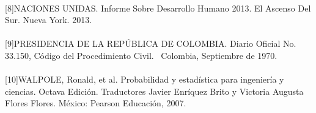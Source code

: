 \paragraph{}
[8]NACIONES UNIDAS. Informe Sobre Desarrollo Humano 2013. El Ascenso Del Sur. Nueva York. 2013.
\paragraph{}
[9]PRESIDENCIA DE LA REP\'UBLICA DE COLOMBIA. Diario Oficial No. 33.150, C\'odigo del Procedimiento Civil.  Colombia, Septiembre de 1970.
\paragraph{}
[10]WALPOLE, Ronald, et al. Probabilidad y estad\'istica para ingenier\'ia y ciencias. Octava Edici\'on. Traductores Javier Enr\'iquez Brito y Victoria Augusta Flores Flores. M\'exico: Pearson Educaci\'on,  2007.
\pagebreak